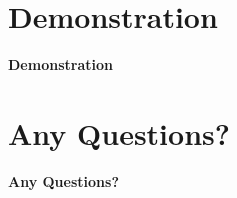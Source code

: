\documentclass[xcolor={usenames,dvipsnames,svgnames}]{beamer}
\begin{document}
\nohead
\section{Demonstration}
\begin{frame}

{\Huge\bfseries Demonstration}
\end{frame}



\nohead 
\section{Any Questions?}
\begin{frame}

{\Huge\bfseries Any Questions?}
\end{frame}

\end{document}
